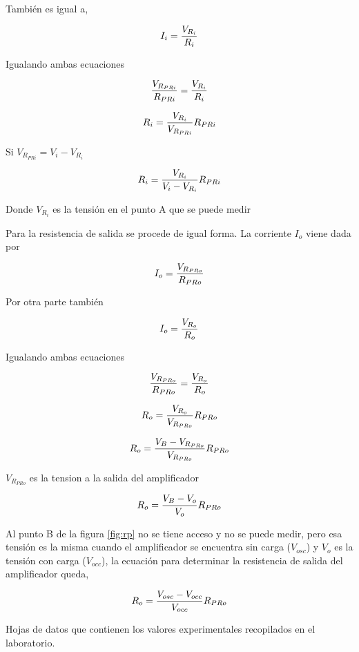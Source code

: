 \documentclass[12pt, a4paper]{article}
\begin{document}
    También es igual a,

    $$I_i = {V_{R_{i}} \over R_{i}}$$

    Igualando ambas ecuaciones

    $${V_{R_{PRi}} \over R_{PRi}} = {V_{R_{i}} \over R_{i}}$$

    $$R_i = {V_{R_{i}} \over V_{R_{PRi}}}R_{PRi}$$

    Si $V_{R_{PRi}} = V_i - V_{R_{i}}$

    \begin{equation} \label{eqri}
        R_i = {V_{R_{i}} \over V_i - V_{R_{i}}}R_{PRi}
    \end{equation}

    Donde $V_{R_i}$ es la tensión en el punto A que se puede medir

    Para la resistencia de salida se procede de igual forma. La corriente $I_o$ viene dada por

    $$I_o = {V_{R_{PRo}} \over R_{PRo}}$$

    Por otra parte también

    $$I_o = {V_{R_o} \over R_o}$$

    Igualando ambas ecuaciones

    $${V_{R_{PRo}} \over R_{PRo}} = {V_{R_o} \over R_o}$$

    $$R_o = {V_{R_o} \over V_{R_{PRo}}}R_{PRo}$$

    $$R_o = {V_B - V_{R_{PRo}} \over V_{R_{PRo}}}R_{PRo}$$

    $V_{R_{PRo}}$ es la tension a la salida del amplificador

    $$R_o = {V_B - V_o \over V_o}R_{PRo}$$

    Al punto B de la figura \ref{fig:rp} no se tiene acceso y no se puede medir, pero esa tensión es la misma cuando el amplificador se encuentra sin carga ($V_{osc}$) y $V_o$ es la tensión con carga ($V_{occ}$), la ecuación para determinar la resistencia de salida del amplificador queda,

    \begin{equation} \label{eqro}
        R_o = {V_{osc} - V_{occ} \over V_{occ}}R_{PRo}
    \end{equation}



    \newpage

    Hojas de datos que contienen los valores experimentales recopilados en el laboratorio.
\end{document}

